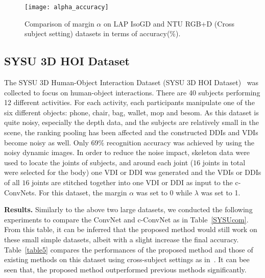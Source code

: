 \documentclass[letterpaper]{article} %
\begin{document}
\begin{table}[ht!]
\centering
\caption{Comparison of the proposed method with previous approaches on SYSU 3D HOI Dataset.\label{table5}}
\end{table}


\begin{figure}[t]
\begin{center}{\texttt{[image: alpha\_accuracy]}}
\end{center}
\caption{Comparison of margin $\alpha$ on LAP IsoGD and NTU RGB+D (Cross subject
setting) datasets in terms of accuracy(\%).\label{alpha} }
\end{figure}

\subsection{SYSU 3D HOI Dataset}
The SYSU 3D Human-Object Interaction Dataset (SYSU 3D HOI
Dataset)~\cite{hu2015jointly}  was collected to focus on human-object
interactions. There are 40 subjects performing 12 different activities. For each
activity, each participants manipulate one of the six different objects: phone,
chair, bag, wallet, mop and besom.
As this dataset is quite noisy, especially
the depth data, and the subjects are relatively small in the scene, the ranking pooling has been affected and the constructed DDIs and VDIs become noisy as well. Only 69\% recognition accuracy was achieved by using the noisy dynamic images. In order to reduce the noise impact,
skeleton data were used to locate the joints of subjects,
and around each joint ($16$ joints in total were selected for the body) one VDI or DDI was generated
and the VDIs or DDIs of all $16$ joints are stitched together into one VDI or DDI as input to the c-ConvNets.
For this dataset, the margin $\alpha$ was set to 0 while $\lambda$ was set to 1.


\textbf{Results.} Similarly to the above two large datasets, we conducted the
following experiments to compare the ConvNet and c-ConvNet as in
Table~\ref{SYSUcom}. From this table, it can be inferred that the proposed
method would still work on these small simple datasets, albeit with a slight
increase the final accuracy. Table~\ref{table5} compares the performances of the proposed method and those
of existing methods on this dataset using cross-subject settings as
in~\cite{hu2015jointly}. It can bee seen that, the proposed method outperformed
previous methods significantly.
\end{document}
